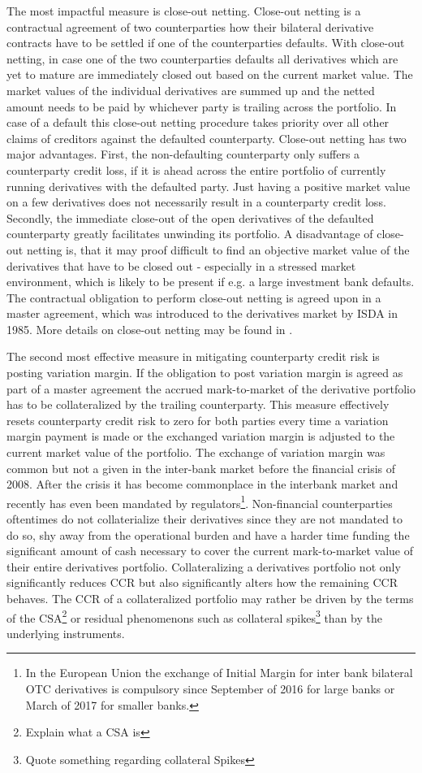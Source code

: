 \documentclass[12pt,a4paper]{article}
\let\footnoteOld\footnote		%
\renewcommand{\footnote}[1]{\linespread{1.0}\footnoteOld{#1}\linespread{1.2}}		%
\begin{document}
The most impactful measure is close-out netting. Close-out netting is a contractual agreement of two counterparties how their bilateral derivative contracts have to be settled if one of the counterparties defaults. With close-out netting, in case one of the two counterparties defaults all derivatives which are yet to mature are immediately closed out based on the current market value. The market values of the individual derivatives are summed up and the netted amount needs to be paid by whichever party is trailing across the portfolio. In case of a default this close-out netting procedure takes priority over all other claims of creditors against the defaulted counterparty. Close-out netting has two major advantages. First, the non-defaulting counterparty only suffers a counterparty credit loss, if it is ahead across the entire portfolio of currently running derivatives with the defaulted party. Just having a positive market value on a few derivatives does not necessarily result in a counterparty credit loss. Secondly, the immediate close-out of the open derivatives of the defaulted counterparty greatly facilitates unwinding its portfolio. A disadvantage of close-out netting is, that it may proof difficult to find an objective market value of the derivatives that have to be closed out - especially in a stressed market environment, which is likely to be present if e.g. a large investment bank defaults. The contractual obligation to perform close-out netting is agreed upon in a master agreement, which was introduced to the derivatives market by ISDA in 1985. More details on close-out netting may be found in \cite[Chapter~5]{gregory2015xva}.

The second most effective measure in mitigating counterparty credit risk is posting variation margin. If the obligation to post variation margin is agreed as part of a master agreement the accrued mark-to-market of the derivative portfolio has to be collateralized by the trailing counterparty. This measure effectively resets counterparty credit risk to zero for both parties every time a variation margin payment is made or the exchanged variation margin is adjusted to the current market value of the portfolio. The exchange of variation margin was common but not a given in the inter-bank market before the financial crisis of 2008. After the crisis it has become commonplace in the interbank market and recently has even been mandated by regulators\footnote{In the European Union the exchange of Initial Margin for inter bank bilateral OTC derivatives is compulsory since September of 2016 for large banks or March of 2017 for smaller banks.}. Non-financial counterparties oftentimes do not collaterialize their derivatives since they are not mandated to do so, shy away from the operational burden and have a harder time funding the significant amount of cash necessary to cover the current mark-to-market value of their entire derivatives portfolio. Collateralizing a derivatives portfolio not only significantly reduces CCR but also significantly alters how the remaining CCR behaves. The CCR of a collateralized portfolio may rather be driven by the terms of the CSA\footnote{Explain what a CSA is} or residual phenomenons such as collateral spikes\footnote{Quote something regarding collateral Spikes} than by the underlying instruments.
\end{document}

